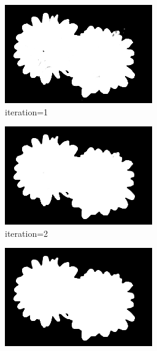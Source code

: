 \documentclass{article}
\begin{document}
\begin{figure}[t]
\captionsetup[subfigure]{labelformat=empty}
\centering
%
\begin{subfigure}[t]{0.19\textwidth}
\centering
\includegraphics[width=\textwidth]{./images/marginals_iter_1.png}
\vspace{-0.6cm}
\caption{iteration=1}
\end{subfigure}
\begin{subfigure}[t]{0.19\textwidth}
\centering
\includegraphics[width=\textwidth]{./images/marginals_iter_2.png}
\vspace{-0.6cm}
\caption{iteration=2}
\end{subfigure}
\begin{subfigure}[t]{0.19\textwidth}
\centering
\includegraphics[width=\textwidth]{./images/marginals_iter_3.png}

\end{subfigure}
\end{figure}
\end{document}
